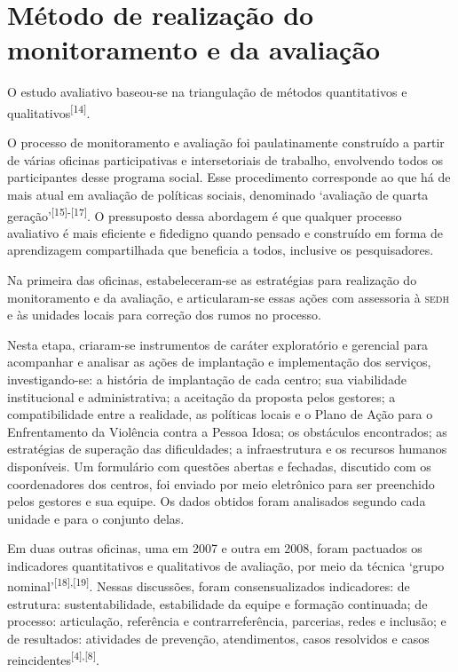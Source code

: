 \documentclass{article}
\begin{document}
\section{Método de realização do monitoramento e da avaliação}

O estudo avaliativo baseou-se na triangulação de métodos quantitativos e
qualitativos\textsuperscript{[}\textsuperscript{14}\textsuperscript{]}.

O processo de monitoramento e avaliação foi paulatinamente construído a partir
de várias oficinas participativas e intersetoriais de trabalho, envolvendo todos
os participantes desse programa social. Esse procedimento corresponde ao que há
de mais atual em avaliação de políticas sociais, denominado ‘avaliação de quarta
geração’\textsuperscript{[}\textsuperscript{15}\textsuperscript{]}\textsuperscript{-}\textsuperscript{[}\textsuperscript{17}\textsuperscript{]}. O pressuposto dessa abordagem é que qualquer processo avaliativo é mais
eficiente e fidedigno quando pensado e construído em forma de aprendizagem
compartilhada que beneficia a todos, inclusive os pesquisadores.

Na primeira das oficinas, estabeleceram-se as estratégias para realização do
monitoramento e da avaliação, e articularam-se essas ações com assessoria à \textsc{sedh}
e às unidades locais para correção dos rumos no processo.

Nesta etapa, criaram-se instrumentos de caráter exploratório e gerencial para
acompanhar e analisar as ações de implantação e implementação dos serviços,
investigando-se: a história de implantação de cada centro; sua viabilidade
institucional e administrativa; a aceitação da proposta pelos gestores; a
compatibilidade entre a realidade, as políticas locais e o Plano de Ação para o
Enfrentamento da Violência contra a Pessoa Idosa; os obstáculos encontrados; as
estratégias de superação das dificuldades; a infraestrutura e os recursos
humanos disponíveis. Um formulário com questões abertas e fechadas, discutido
com os coordenadores dos centros, foi enviado por meio eletrônico para ser
preenchido pelos gestores e sua equipe. Os dados obtidos foram analisados
segundo cada unidade e para o conjunto delas.

Em duas outras oficinas, uma em 2007 e outra em 2008, foram pactuados os
indicadores quantitativos e qualitativos de avaliação, por meio da técnica
‘grupo nominal’\textsuperscript{[}\textsuperscript{18}\textsuperscript{]}\textsuperscript{,}\textsuperscript{[}\textsuperscript{19}\textsuperscript{]}. Nessas discussões, foram consensualizados indicadores: de estrutura:
sustentabilidade, estabilidade da equipe e formação continuada; de processo:
articulação, referência e contrarreferência, parcerias, redes e inclusão; e de
resultados: atividades de prevenção, atendimentos, casos resolvidos e casos
reincidentes\textsuperscript{[}\textsuperscript{4}\textsuperscript{]}\textsuperscript{,}\textsuperscript{[}\textsuperscript{8}\textsuperscript{]}.
\end{document}
